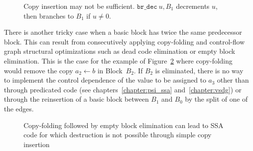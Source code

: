 \begin{figure}[h]
\hfill
{}
\hfill
{}
\caption{Copy insertion may not be sufficient. $\texttt{br\_dec}\ u,B_1$ decrements $u$, then branches to $B_1$ if $u\neq 0$.\label{fig:alternative_ssa_destruction:ex_jump_impossible}}
\end{figure}

There is another tricky case when a basic block has twice the same predecessor block. 
This can result from consecutively applying copy-folding and control-flow graph structural optimizations such as dead code elimination or empty block elimination. 
This is the case for the example of Figure~\ref{fig:alternative_ssa_destruction:doublepreds} where copy-folding would remove the copy $a_2\gets b$ in Block~$B_2$. 
If $B_2$ is eliminated, there is no way to implement the control dependence of the value to be assigned to $a_3$ other than through predicated code (see chapters~\ref{chapter:psi_ssa} and~\ref{chapter:vsdg}) or through the reinsertion of a basic block between $B_1$ and $B_0$ by the split of one of the edges.

\begin{figure}[h]
\hfill
{}\hfill
{}\caption{\label{fig:alternative_ssa_destruction:doublepreds} Copy-folding followed by empty block elimination can lead to SSA code for which destruction is not possible through simple copy insertion}
\end{figure}


